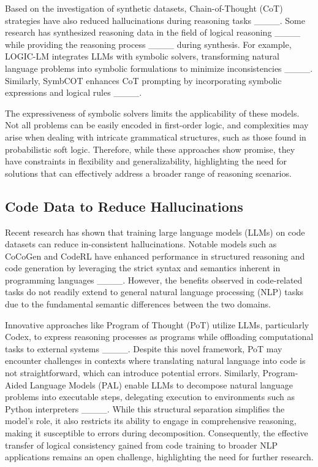 Based on the investigation of synthetic datasets, Chain-of-Thought (CoT) strategies have also reduced hallucinations during reasoning tasks ____. Some research has synthesized reasoning data in the field of logical reasoning ____ while providing the reasoning process ____ during synthesis. For example, LOGIC-LM integrates LLMs with symbolic solvers, transforming natural language problems into symbolic formulations to minimize inconsistencies ____. Similarly, SymbCOT enhances CoT prompting by incorporating symbolic expressions and logical rules ____.


The expressiveness of symbolic solvers limits the applicability of these models. Not all problems can be easily encoded in first-order logic, and complexities may arise when dealing with intricate grammatical structures, such as those found in probabilistic soft logic. Therefore, while these approaches show promise, they have constraints in flexibility and generalizability, highlighting the need for solutions that can effectively address a broader range of reasoning scenarios.


\subsection{Code Data to Reduce Hallucinations}


Recent research has shown that training large language models (LLMs) on code datasets can reduce in-consistent hallucinations. Notable models such as CoCoGen and CodeRL have enhanced performance in structured reasoning and code generation by leveraging the strict syntax and semantics inherent in programming languages ____. However, the benefits observed in code-related tasks do not readily extend to general natural language processing (NLP) tasks due to the fundamental semantic differences between the two domains.


Innovative approaches like Program of Thought (PoT) utilize LLMs, particularly Codex, to express reasoning processes as programs while offloading computational tasks to external systems ____. Despite this novel framework, PoT may encounter challenges in contexts where translating natural language into code is not straightforward, which can introduce potential errors. Similarly, Program-Aided Language Models (PAL) enable LLMs to decompose natural language problems into executable steps, delegating execution to environments such as Python interpreters ____. While this structural separation simplifies the model's role, it also restricts its ability to engage in comprehensive reasoning, making it susceptible to errors during decomposition. Consequently, the effective transfer of logical consistency gained from code training to broader NLP applications remains an open challenge, highlighting the need for further research.





